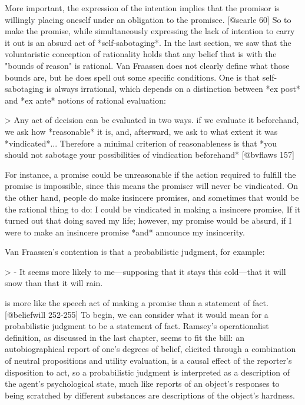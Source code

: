 More important, the expression of the intention implies that the
promisor is willingly placing oneself under an obligation to the
promisee. {[}@searle 60{]} So to make the promise, while simultaneously
expressing the lack of intention to carry it out is an absurd act of
*self-sabotaging*. In the last section, we saw that the voluntaristic
conception of rationality holds that any belief that is with the "bounds
of reason" is rational. Van Fraassen does not clearly define what those
bounds are, but he does spell out some specific conditions. One is that
self-sabotaging is always irrational, which depends on a distinction
between *ex post* and *ex ante* notions of rational evaluation:

\textgreater{} Any act of decision can be evaluated in two ways. if we
evaluate it beforehand, we ask how *reasonable* it is, and, afterward,
we ask to what extent it was *vindicated*... Therefore a minimal
criterion of reasonableness is that *you should not sabotage your
possibilities of vindication beforehand* {[}@bvflaws 157{]}

For instance, a promise could be unreasonable if the action required to
fulfill the promise is impossible, since this means the promiser will
never be vindicated. On the other hand, people do make insincere
promises, and sometimes that would be the rational thing to do: I could
be vindicated in making a insincere promise, If it turned out that doing
saved my life; however, my promise would be absurd, if I were to make an
insincere promise *and* announce my insincerity.

Van Fraassen's contention is that a probabilistic judgment, for example:

\textgreater{} - It seems more likely to me---supposing that it stays
this cold---that it will snow than that it will rain.

is more like the speech act of making a promise than a statement of
fact.{[}@beliefwill 252-255{]} To begin, we can consider what it would
mean for a probabilistic judgment to be a statement of fact. Ramsey's
operationalist definition, as discussed in the last chapter, seems to
fit the bill: an autobiographical report of one's degrees of belief,
elicited through a combination of neutral propositions and utility
evaluation, is a causal effect of the reporter's disposition to act, so
a probabilistic judgment is interpreted as a description of the agent's
psychological state, much like reports of an object's responses to being
scratched by different substances are descriptions of the object's
hardness.

